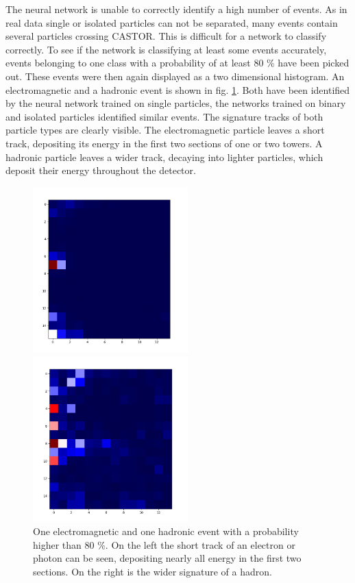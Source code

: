 The neural network is unable to correctly identify a high number of events. As in real data single or isolated particles can not be separated, many events contain several particles crossing CASTOR. This is difficult for a network to classify correctly. To see if the network is classifying at least some events accurately, events belonging to one class with a probability of at least 80 \% have been picked out. These events were then again displayed as a two dimensional histogram. An electromagnetic and a hadronic event is shown in fig. \ref{electron}. Both have been identified by the neural network trained on single particles, the networks trained on binary and isolated particles identified similar events. The signature tracks of both particle types are clearly visible. The electromagnetic particle leaves a short track, depositing its energy in the first two sections of one or two towers. A hadronic particle leaves a wider track, decaying into lighter particles, which deposit their energy throughout the detector.
\begin{figure}
\centering
\begin{minipage}{0.45\textwidth}
\includegraphics[width=6cm]{electron.png}
\end{minipage}
\begin{minipage}{0.45\textwidth}
\includegraphics[width=6cm]{hadron.png}
\end{minipage}
\caption{One electromagnetic and one hadronic event with a probability higher than 80 \%. On the left the short track of an electron or photon can be seen, depositing nearly all energy in the first two sections. On the right is the wider signature of a hadron.}
\label{electron}
\end{figure}

